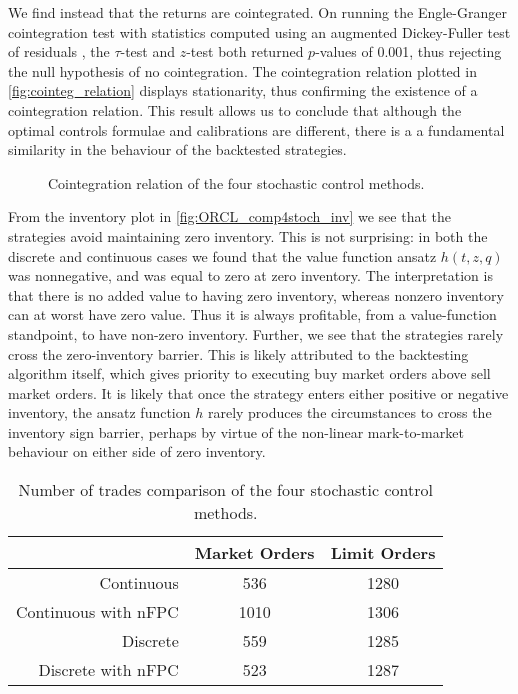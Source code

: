 We find instead that the returns are cointegrated. On running the Engle-Granger cointegration test \citep{engle1987co} with statistics computed using an augmented Dickey-Fuller test of residuals \citep{dickey1979distribution}, the $\tau$-test and $z$-test both returned $p$-values of 0.001, thus rejecting the null hypothesis of no cointegration. The cointegration relation plotted in \autoref{fig:cointeg_relation} displays stationarity, thus confirming the existence of a cointegration relation. This result allows us to conclude that although the optimal controls formulae and calibrations are different, there is a a fundamental similarity in the behaviour of the backtested strategies.

\begin{figure}[H]
  \centering
  \setlength{} 
  \setlength{}
  
  \caption[Cointegration relation of the four stochastic control methods]{Cointegration relation of the four stochastic control methods.}
  \label{fig:cointeg_relation}
\end{figure}
From the inventory plot in \autoref{fig:ORCL_comp4stoch_inv} we see that the strategies avoid maintaining zero inventory. This is not surprising: in both the discrete and continuous cases we found that the value function ansatz $h(t,z,q)$ was nonnegative, and was equal to zero at zero inventory. The interpretation is that there is no added value to having zero inventory, whereas nonzero inventory can at worst have zero value. Thus it is always profitable, from a value-function standpoint, to have non-zero inventory. Further, we see that the strategies rarely cross the zero-inventory barrier. This is likely attributed to the backtesting algorithm itself, which gives priority to executing buy market orders above sell market orders. It is likely that once the strategy enters either positive or negative inventory, the ansatz function $h$ rarely produces the circumstances to cross the inventory sign barrier, perhaps by virtue of the non-linear mark-to-market behaviour on either side of zero inventory.

\begin{table}[htb]
\centering
{}
\caption[Number of trades comparison of the four stochastic control methods]{Number of trades comparison of the four stochastic control methods.}\label{tbl:ORCL_comp4stoch_numt}
\begin{tabular}{@{} r *{2}{c} @{}}
\toprule
& Market Orders & Limit Orders \\
\midrule
Continuous          &  536 & 1280 \\
Continuous with nFPC   & 1010 & 1306 \\
Discrete         &  559 & 1285 \\
Discrete with nFPC  &  523 & 1287 \\
\bottomrule
\end{tabular}
\end{table}

